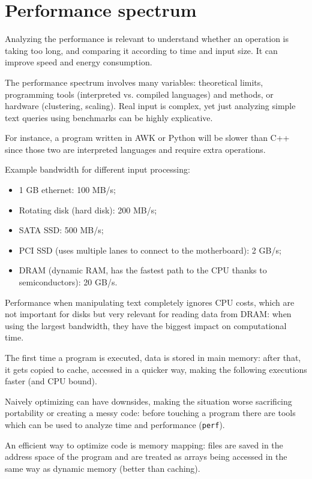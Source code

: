 
\section{Performance spectrum}
Analyzing the performance is relevant to understand whether an operation is taking too long, and comparing it according to time and input size. It can improve speed and energy consumption.

The performance spectrum involves many variables: theoretical limits, programming tools (interpreted vs. compiled languages) and methods, or hardware (clustering, scaling). Real input is complex, yet just analyzing simple text queries using benchmarks can be highly explicative.

For instance, a program written in AWK or Python will be slower than C++ since those two are interpreted languages and require extra operations.

Example bandwidth for different input processing:
\begin{itemize}
	\item 1 GB ethernet: 100 MB/s;
	\item Rotating disk (hard disk): 200 MB/s;
	\item SATA SSD: 500 MB/s;
	\item PCI SSD (uses multiple lanes to connect to the motherboard): 2 GB/s;
	\item DRAM (dynamic RAM, has the fastest path to the CPU thanks to semiconductors): 20 GB/s.
\end{itemize}

Performance when manipulating text completely ignores CPU costs, which are not important for disks but very relevant for reading data from DRAM: when using the largest bandwidth, they have the biggest impact on computational time.

The first time a program is executed, data is stored in main memory: after that, it gets copied to cache, accessed in a quicker way, making the following executions faster (and CPU bound).

Naively optimizing can have downsides, making the situation worse sacrificing portability or creating a messy code: before touching a program there are tools which can be used to analyze time and performance (\texttt{perf}).

An efficient way to optimize code is memory mapping: files are saved in the address space of the program and are treated as arrays being accessed in the same way as dynamic memory (better than caching).


